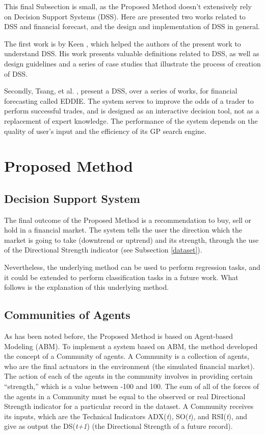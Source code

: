 \documentclass[12pt,journal,draftcls,onecolumn]{IEEEtran}
\begin{document}
This final Subsection is small, as the Proposed Method doesn't extensively rely on Decision Support Systems (DSS). Here are presented two works related to DSS and financial forecast, and the design and implementation of DSS in general.

The first work is by Keen \cite{keen1980decision}, which helped the authors of the present work to understand DSS. His work presents valuable definitions related to DSS, as well as design guidelines and a series of case studies that illustrate the process of creation of DSS.

Secondly, Tsang, et al. \cite{tsang1998eddie} \cite{tsang2000eddie} \cite{Tsang2004}  \cite{Tsang2008}, present a DSS, over a series of works, for financial forecasting called EDDIE. The system serves to improve the odds of a trader to perform successful trades, and is designed as an interactive decision tool, not as a replacement of expert knowledge. The performance of the system depends on the quality of user's input and the efficiency of its GP search engine.

\section{Proposed Method}
\label{proposed-method}

\subsection{Decision Support System}

The final outcome of the Proposed Method is a recommendation to buy, sell or hold in a financial market. The system tells the user the direction which the market is going to take (downtrend or uptrend) and its strength, through the use of the Directional Strength indicator (see Subsection \ref{dataset}).

Nevertheless, the underlying method can be used to perform regression tasks, and it could be extended to perform classification tasks in a future work. What follows is the explanation of this underlying method.

\subsection{Communities of Agents}
\label{communities-of-agents}

As has been noted before, the Proposed Method is based on Agent-based Modeling (ABM). To implement a system based on ABM, the method developed the concept of a Community of agents. A Community is a collection of agents, who are the final actuators in the environment (the simulated financial market). The action of each of the agents in the community involves in providing certain ``strength,'' which is a value between -100 and 100. The sum of all of the forces of the agents in a Community must be equal to the observed or real Directional Strength indicator for a particular record in the dataset. A Community receives its inputs, which are the Technical Indicators ADX(\textit{t}), SO(\textit{t}), and RSI(\textit{t}), and give as output the DS(\textit{t+1}) (the Directional Strength of a future record).
\end{document}
